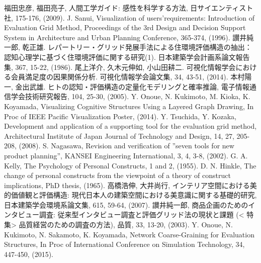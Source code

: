 \documentclass[syuuron]{kuee}
\begin{document}


\begin{thebibliography}{数字}
	 福田忠彦, 福田亮子, 人間工学ガイド: 感性を科学する方法, 日サイエンティスト社, 175-176, (2009).
	 J. Sanui, Visualization of users’requirements: Introduction of Evaluation Grid Method, Proceedings of the 3rd Design and Decision Support System in Architecture and Urban Planning Conference, 365-374, (1996).
	 讃井純一郎, 乾正雄. レパートリー・グリッド発展手法による住環境評価構造の抽出：認知心理学に基づく住環境評価に関する研究(1). 日本建築学会計画系論文報告集, 367, 15-22, (1986).
	 尾上洋介, 久木元伸如, 小山田耕二. 可視化情報学会における会員満足度の因果関係分析. 可視化情報学会論文集, 34, 43-51, (2014).
	 本村陽一, 金出武雄. ヒトの認知・評価構造の定量化モデリングと確率推論, 電子情報通信学会技術研究報告, 104, 25-30, (2005).
	 Y. Onoue, N. Kukimoto, M. Kioka, K. Koyamada, Visualizing Cognitive Structures Using a Layered Graph Drawing, In Proc of IEEE Pacific Visualization Poster, (2014).
	 Y. Tsuchida, Y. Kozaka, Development and application of a supporting tool for the evaluation grid method, Architectural Institute of Japan Journal of Technology and Design, 14, 27, 205-208, (2008).
	 S. Nagasawa, Revision and verification of ”seven tools for new product planning”, KANSEI Engineering International, 3, 4, 3-8, (2002).
	 G. A. Kelly, The Psychology of Personal Constructs, 1 and 2, (1955).
	 D. N. Hinkle, The change of personal constructs from the viewpoint of a theory of construct implications, PhD thesis, (1965).
	 高橋浩伸, 大井尚行, インテリア空間における美的価値観と評価構造: 現代日本人の建築空間における美意識に関する基礎的研究, 日本建築学会環境系論文集, 615, 59-64, (2007).
	 讃井純一郎, 商品企画のためのインタビュー調査: 従来型インタビュー調査と評価グリッド法の現状と課題 (< 特集> 品質経営のための調査の方法), 品質, 33, 13-20, (2003).
	 Y. Onoue, N. Kukimoto, N. Sakamoto, K. Koyamada, Network Coarse-Graining for Evaluation Structures, In Proc of International Conference on Simulation Technology, 34, 447-450, (2015). 

\end{thebibliography}
\end{document}
